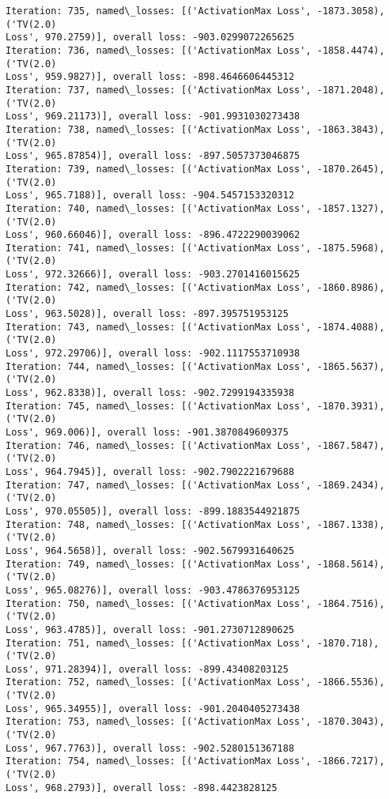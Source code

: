 \documentclass[10pt]{article}
\begin{document}
\begin{Verbatim}[commandchars=\\\{\}]
Iteration: 735, named\_losses: [('ActivationMax Loss', -1873.3058), ('TV(2.0)
Loss', 970.2759)], overall loss: -903.0299072265625
Iteration: 736, named\_losses: [('ActivationMax Loss', -1858.4474), ('TV(2.0)
Loss', 959.9827)], overall loss: -898.4646606445312
Iteration: 737, named\_losses: [('ActivationMax Loss', -1871.2048), ('TV(2.0)
Loss', 969.21173)], overall loss: -901.9931030273438
Iteration: 738, named\_losses: [('ActivationMax Loss', -1863.3843), ('TV(2.0)
Loss', 965.87854)], overall loss: -897.5057373046875
Iteration: 739, named\_losses: [('ActivationMax Loss', -1870.2645), ('TV(2.0)
Loss', 965.7188)], overall loss: -904.5457153320312
Iteration: 740, named\_losses: [('ActivationMax Loss', -1857.1327), ('TV(2.0)
Loss', 960.66046)], overall loss: -896.4722290039062
Iteration: 741, named\_losses: [('ActivationMax Loss', -1875.5968), ('TV(2.0)
Loss', 972.32666)], overall loss: -903.2701416015625
Iteration: 742, named\_losses: [('ActivationMax Loss', -1860.8986), ('TV(2.0)
Loss', 963.5028)], overall loss: -897.395751953125
Iteration: 743, named\_losses: [('ActivationMax Loss', -1874.4088), ('TV(2.0)
Loss', 972.29706)], overall loss: -902.1117553710938
Iteration: 744, named\_losses: [('ActivationMax Loss', -1865.5637), ('TV(2.0)
Loss', 962.8338)], overall loss: -902.7299194335938
Iteration: 745, named\_losses: [('ActivationMax Loss', -1870.3931), ('TV(2.0)
Loss', 969.006)], overall loss: -901.3870849609375
Iteration: 746, named\_losses: [('ActivationMax Loss', -1867.5847), ('TV(2.0)
Loss', 964.7945)], overall loss: -902.7902221679688
Iteration: 747, named\_losses: [('ActivationMax Loss', -1869.2434), ('TV(2.0)
Loss', 970.05505)], overall loss: -899.1883544921875
Iteration: 748, named\_losses: [('ActivationMax Loss', -1867.1338), ('TV(2.0)
Loss', 964.5658)], overall loss: -902.5679931640625
Iteration: 749, named\_losses: [('ActivationMax Loss', -1868.5614), ('TV(2.0)
Loss', 965.08276)], overall loss: -903.4786376953125
Iteration: 750, named\_losses: [('ActivationMax Loss', -1864.7516), ('TV(2.0)
Loss', 963.4785)], overall loss: -901.2730712890625
Iteration: 751, named\_losses: [('ActivationMax Loss', -1870.718), ('TV(2.0)
Loss', 971.28394)], overall loss: -899.43408203125
Iteration: 752, named\_losses: [('ActivationMax Loss', -1866.5536), ('TV(2.0)
Loss', 965.34955)], overall loss: -901.2040405273438
Iteration: 753, named\_losses: [('ActivationMax Loss', -1870.3043), ('TV(2.0)
Loss', 967.7763)], overall loss: -902.5280151367188
Iteration: 754, named\_losses: [('ActivationMax Loss', -1866.7217), ('TV(2.0)
Loss', 968.2793)], overall loss: -898.4423828125

\end{Verbatim}
\end{document}
